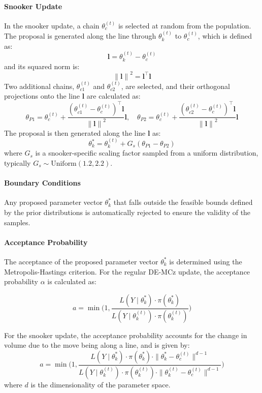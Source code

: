 \paragraph{Snooker Update}
In the snooker update, a chain $\theta_c^{(t)}$ is selected at random from the population. 
The proposal is generated along the line through $\theta_k^{(t)}$ to $\theta_{c}^{(t)}$, which is defined as:
$$\mathbf{l} = \theta_k^{(t)} - \theta_{c}^{(t)}$$
and its squared norm is:
$${\parallel\mathbf{l}\parallel}^2 = \mathbf{l}^\top \mathbf{l}$$
Two additional chains, $\theta_{c1}^{(t)}$ and $\theta_{c2}^{(t)}$, are selected, and their orthogonal projections onto the line $\mathbf{l}$ are calculated as:
$$\theta_{P1} = \theta_{c}^{(t)} + \frac{(\theta_{c1}^{(t)} - \theta_{c}^{(t)})^\top \mathbf{l}}{{\parallel\mathbf{l}\parallel}^2}\mathbf{l}, \quad \theta_{P2} = \theta_{c}^{(t)} + \frac{(\theta_{c2}^{(t)} - \theta_{c}^{(t)})^\top \mathbf{l}}{{\parallel\mathbf{l}\parallel}^2}\mathbf{l}$$
The proposal is then generated along the line $\mathbf{l}$ as:
$$\theta_k^* = \theta_k^{(t)} + G_s( \theta_{P1} - \theta_{P2})$$
where $G_s$ is a snooker-specific scaling factor sampled from a uniform distribution, typically $G_s \sim \text{Uniform}(1.2, 2.2)$.


\paragraph{Boundary Conditions}
Any proposed parameter vector $\theta_k^*$ that falls outside the feasible bounds defined by the prior distributions is automatically rejected to ensure the validity of the samples.

\paragraph{Acceptance Probability}
The acceptance of the proposed parameter vector $\theta_k^*$ is determined using the Metropolis-Hastings criterion. For the regular DE-MCz update, the acceptance probability $\alpha$ is calculated as:

$$a = \min \bigg(1, \frac{L(Y \mid \theta_k^*) \cdot \pi(\theta_k^*)}{L(Y \mid \theta_k^{(t)}) \cdot \pi(\theta_k^{(t)})}\bigg)$$

For the snooker update, the acceptance probability accounts for the change in volume due to the move being along a line, and is given by:
$$a = \min \bigg(1, \frac{L(Y \mid \theta_k^*) \cdot \pi(\theta_k^*) \cdot \parallel \theta_k^* - \theta_c^{(t)}\parallel ^{d-1}}{L(Y \mid \theta_k^{(t)}) \cdot \pi(\theta_k^{(t)}) \cdot \parallel \theta_k^{(t)} - \theta_c^{(t)}\parallel ^{d-1}}\bigg)$$
where $d$ is the dimensionality of the parameter space.

